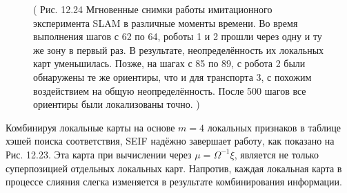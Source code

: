 \documentclass[10pt,a4paper]{article}
\begin{document}
\begin{figure}[H]
	\caption{ ( Рис. 12.24 Мгновенные снимки работы имитационного эксперимента SLAM в различные моменты времени. Во время выполнения шагов с 62 по 64, роботы 1 и 2 прошли через одну и ту же зону в первый раз. В результате, неопределённость их локальных карт уменьшилась. Позже, на шагах с 85 по 89, с робота 2 были обнаружены те же ориентиры, что и для транспорта 3, с похожим воздействием на общую неопределённость. После 500 шагов все ориентиры были локализованы точно. ) }
	\label{fig:1224orig}
\end{figure}

Комбинируя локальные карты на основе $m=4$ локальных признаков в таблице хэшей поиска соответствия, SEIF надёжно завершает работу, как показано на Рис. 12.23. Эта карта при вычислении через $\mu=\varOmega^{-1}\xi$, является не только суперпозицией отдельных локальных карт. Напротив, каждая локальная карта в процессе слияния слегка изменяется в результате комбинирования информации.
\end{document}

